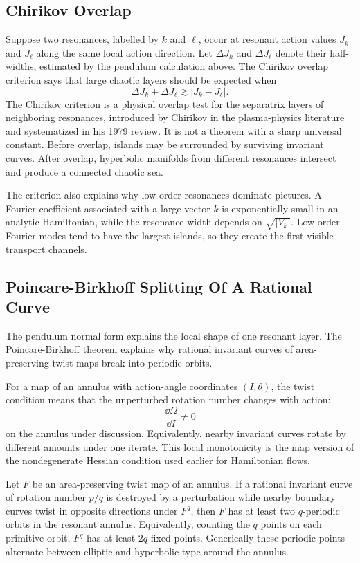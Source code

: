 \subsection{Chirikov Overlap}
\label{subsec:chirikov-overlap}

Suppose two resonances, labelled by \(k\) and \(\ell\), occur at resonant action
values \(J_k\) and \(J_\ell\) along the same local action direction. Let
\(\Delta J_k\) and \(\Delta J_\ell\) denote their half-widths, estimated by the
pendulum calculation above. The Chirikov overlap criterion says that large
chaotic layers should be expected when
\[
  \boxed{
  \Delta J_k+\Delta J_\ell
  \gtrsim |J_k-J_\ell|.
  }
\]
The Chirikov criterion is a physical overlap test for the separatrix layers of
neighboring resonances, introduced by Chirikov in the plasma-physics literature
and systematized in his 1979 review. It is not a theorem with a sharp universal
constant. Before overlap, islands may be surrounded by surviving invariant
curves. After overlap, hyperbolic manifolds from different resonances intersect
and produce a connected chaotic sea.

The criterion also explains why low-order resonances dominate pictures. A
Fourier coefficient associated with a large vector \(k\) is exponentially small
in an analytic Hamiltonian, while the resonance width depends on
\(\sqrt{|V_k|}\). Low-order Fourier modes tend to have the largest islands, so
they create the first visible transport channels.

\subsection{Poincare-Birkhoff Splitting Of A Rational Curve}
\label{subsec:poincare-birkhoff-splitting}

The pendulum normal form explains the local shape of one resonant layer. The
Poincare-Birkhoff theorem explains why rational invariant curves of
area-preserving twist maps break into periodic orbits.

For a map of an annulus with action-angle coordinates \((I,\theta)\), the
twist condition means that the unperturbed rotation number changes with
action:
\[
  \frac{\dd \Omega}{\dd I}\neq0
\]
on the annulus under discussion.  Equivalently, nearby invariant curves rotate
by different amounts under one iterate.  This local monotonicity is the map
version of the nondegenerate Hessian condition used earlier for Hamiltonian
flows.

\begin{proposition}
Let \(F\) be an area-preserving twist map of an annulus. If a rational
invariant curve of rotation number \(p/q\) is destroyed by a perturbation while
nearby boundary curves twist in opposite directions under \(F^q\), then
\(F\) has at least two \(q\)-periodic orbits in the resonant annulus. Equivalently,
counting the \(q\) points on each primitive orbit, \(F^q\) has at least \(2q\)
fixed points. Generically these periodic points alternate between elliptic and
hyperbolic type around the annulus.
\end{proposition}

